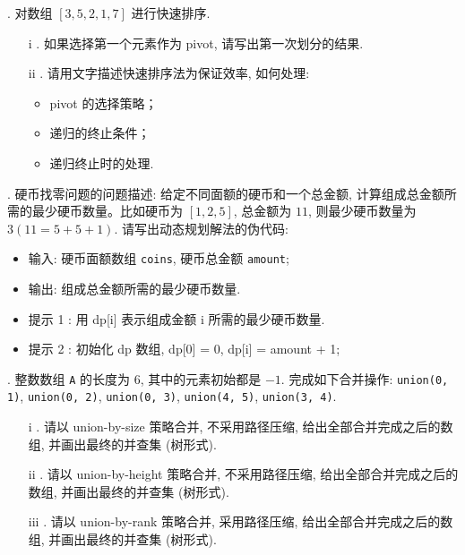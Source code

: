 \documentclass[a4paper]{ctexart}
\theoremstyle{definition}
\theoremstyle{definition}
\begin{document}
. 对数组 $[3, 5, 2, 1, 7]$ 进行快速排序. 
\begin{enumerate}
    \item[i]. 如果选择第一个元素作为 pivot, 请写出第一次划分的结果.
    \item[ii]. 请用文字描述快速排序法为保证效率, 如何处理:
    \begin{itemize}
        \item pivot 的选择策略；
        \item 递归的终止条件；
        \item 递归终止时的处理.
    \end{itemize}
\end{enumerate}

. 硬币找零问题的问题描述: 给定不同面额的硬币和一个总金额, 
计算组成总金额所需的最少硬币数量。比如硬币为 $[1, 2, 5]$, 总金额为 $11$, 
则最少硬币数量为 $3 (11 = 5 + 5 + 1)$. 请写出动态规划解法的伪代码:
\begin{itemize}
    \item 输入: 硬币面额数组 \verb|coins|, 硬币总金额 \verb|amount|;
    \item 输出: 组成总金额所需的最少硬币数量. 
    \item 提示 1 : 用 dp[i] 表示组成金额 i 所需的最少硬币数量.
    \item 提示 2 : 初始化 dp 数组, dp[0] = 0, dp[i] = amount + 1;
\end{itemize}

. 整数数组 \verb|A| 的长度为 $6$, 其中的元素初始都是 $-1$. 
完成如下合并操作: \verb|union(0, 1)|, \verb|union(0, 2)|, \verb|union(0, 3)|,
\verb|union(4, 5)|, \verb|union(3, 4)|.
\begin{enumerate}
    \item[i]. 请以 union-by-size 策略合并, 不采用路径压缩, 给出全部合并完成之后的数组, 
    并画出最终的并查集 (树形式).
    \item[ii]. 请以 union-by-height 策略合并,  不采用路径压缩, 给出全部合并完成之后的数组, 
    并画出最终的并查集 (树形式).
    \item[iii]. 请以 union-by-rank 策略合并, 采用路径压缩, 给出全部合并完成之后的数组, 
    并画出最终的并查集 (树形式). 
\end{enumerate}
\end{document}
